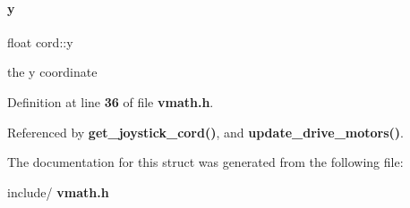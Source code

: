 \mbox{\label{structcord_a4e7d289c55cfe511532e53a81dc19215}} 
\paragraph{y}
{\footnotesize\ttfamily float cord\+::y}

the y coordinate 

Definition at line \textbf{ 36} of file \textbf{ vmath.\+h}.



Referenced by \textbf{ get\+\_\+joystick\+\_\+cord()}, and \textbf{ update\+\_\+drive\+\_\+motors()}.



The documentation for this struct was generated from the following file\+:\begin{DoxyCompactItemize}
\item 
include/\textbf{ vmath.\+h}\end{DoxyCompactItemize}

